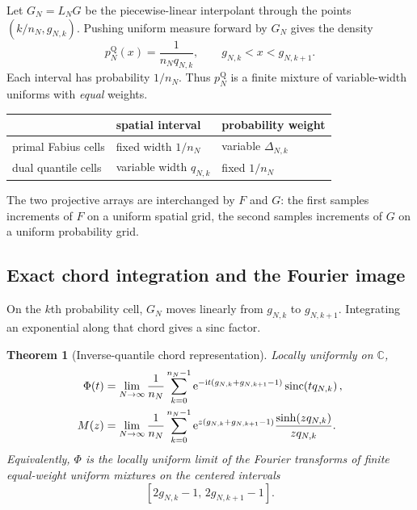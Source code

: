 \documentclass[11pt]{article}
\newtheorem{theorem}{Theorem}[section]
\theoremstyle{definition}
\theoremstyle{remark}
\newcommand{\C}{\mathbb C}
\begin{document}
Let $G_N=L_NG$ be the piecewise-linear interpolant through the points
$(k/n_N,g_{N,k})$.  Pushing uniform measure forward by $G_N$ gives the density
\begin{equation}\label{p3:eq:pQN}
 p_N^{\mathrm Q}(x)
 =\frac{1}{n_Nq_{N,k}},
 \qquad g_{N,k}<x<g_{N,k+1}.
\end{equation}
Each interval has probability $1/n_N$.  Thus $p_N^{\mathrm Q}$ is a finite
mixture of variable-width uniforms with \emph{equal} weights.

\begin{resultboxPartl}
\begin{center}
\begin{tabular}{@{}lll@{}}
\toprule
 & spatial interval & probability weight\\
\midrule
primal Fabius cells & fixed width $1/n_N$ & variable $\Delta_{N,k}$\\
dual quantile cells & variable width $q_{N,k}$ & fixed $1/n_N$\\
\bottomrule
\end{tabular}
\end{center}
The two projective arrays are interchanged by $F$ and $G$: the first samples
increments of $F$ on a uniform spatial grid, the second samples increments of
$G$ on a uniform probability grid.
\end{resultboxPartl}

\subsection{Exact chord integration and the Fourier image}

On the $k$th probability cell, $G_N$ moves linearly from $g_{N,k}$ to
$g_{N,k+1}$.  Integrating an exponential along that chord gives a sinc factor.

\begin{theorem}[Inverse-quantile chord representation]
\label{p3:thm:quantile-chord}
Locally uniformly on $\C$,
\begin{align}
 \Phi(t)
 &=\lim_{N\to\infty}\frac1{n_N}
 \sum_{k=0}^{n_N-1}
 \mathrm e^{-\mathrm i t(g_{N,k}+g_{N,k+1}-1)}
 \operatorname{sinc}\!\left(tq_{N,k}\right),
 \label{p3:eq:Phi-quantile-chord}\\
 M(z)
 &=\lim_{N\to\infty}\frac1{n_N}
 \sum_{k=0}^{n_N-1}
 \mathrm e^{z(g_{N,k}+g_{N,k+1}-1)}
 \frac{\sinh(zq_{N,k})}{zq_{N,k}}.
 \label{p3:eq:M-quantile-chord}
\end{align}
Equivalently, $\Phi$ is the locally uniform limit of the Fourier transforms of
finite equal-weight uniform mixtures on the centered intervals
\begin{equation}\label{p3:eq:centered-quantile-intervals}
 [2g_{N,k}-1,\,2g_{N,k+1}-1].
\end{equation}
\end{theorem}
\end{document}
